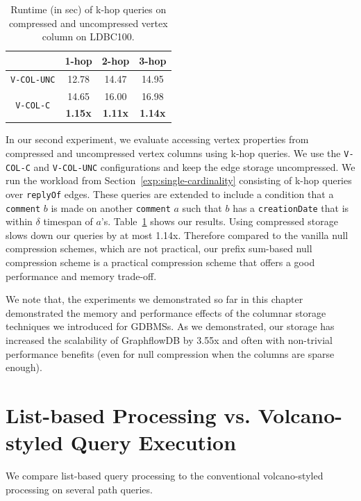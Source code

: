 \begin{table}
	\centering
	\bgroup
	\setlength{\tabcolsep}{8pt}
	\def\arraystretch{1.2}%
	\begin{tabular}{ |c|c|c|c| } 
		\hline
		& \textbf{1-hop} & \textbf{2-hop} & \textbf{3-hop} \\
		\hline \hline
		\texttt{V-COL-UNC}& 12.78 & 14.47 & 14.95\\ 
		\hline
		\multirow{2}{*}{\texttt{V-COL-C}}& 14.65 & 16.00 & 16.98 \\ 
		& \textbf{1.15x} & \textbf{1.11x} & \textbf{1.14x}\\ 
		\hline  
	\end{tabular}
	\egroup
	\captionsetup{justification=centering}
	\caption{Runtime (in sec) of k-hop queries on compressed and uncompressed vertex column on LDBC100.}
	\label{tbl:s3}
\end{table}

In our second experiment, we evaluate accessing vertex properties from compressed and uncompressed vertex columns using k-hop queries. We use the \texttt{V-COL-C} and \texttt{V-COL-UNC} configurations and keep the edge storage uncompressed. We run the workload from Section~\ref{exp:single-cardinality} consisting of k-hop queries over \texttt{replyOf} edges. These queries are extended to include a condition that a \texttt{comment} $b$ is made on another \texttt{comment} $a$ such that $b$ has a \texttt{creationDate} that is within $\delta$ timespan of $a$'s. Table~\ref{tbl:s3} shows our results. Using compressed storage slows down our queries by at most 1.14x. Therefore compared to the vanilla null compression schemes, which are not practical, our prefix sum-based null compression scheme is a practical compression scheme that offers a good performance and memory trade-off.

We note that, the experiments we demonstrated so far in this chapter demonstrated the memory and performance effects of the columnar storage techniques we introduced for GDBMSs. As we demonstrated, our storage has increased the scalability of GraphflowDB by 3.55x and often with non-trivial performance benefits (even for null compression when the columns are sparse enough). 

\section{List-based Processing vs. Volcano-styled Query Execution}
\label{exp:list-based}

We compare list-based query processing to the conventional volcano-styled processing on several path queries.





















